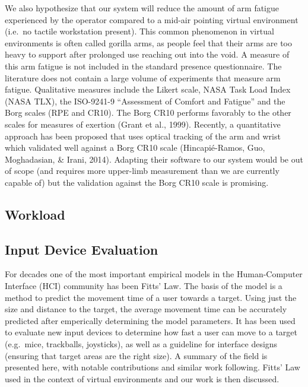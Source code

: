 We also hypothesize that our system will reduce the amount of arm fatigue experienced by the operator compared to a mid-air pointing virtual environment (i.e.\ no tactile workstation present).
This common phenomenon in virtual environments is often called gorilla arms, as people feel that their arms are too heavy to support after prolonged use reaching out into the void.
A measure of this arm fatigue is not included in the standard presence questionnaire.
The literature does not contain a large volume of experiments that measure arm fatigue.
 Qualitative measures include the Likert scale, NASA Task Load Index (NASA TLX), the ISO-9241-9 ``Assessment of Comfort and Fatigue'' and the Borg scales (RPE and CR10).
The Borg CR10 performs favorably to the other scales for measures of exertion (Grant et al., 1999).
Recently, a quantitative approach has been proposed that uses optical tracking of the arm and wrist which validated well against a Borg CR10 scale (Hincapié-Ramos, Guo, Moghadasian, \& Irani, 2014).
Adapting their software to our system would be out of scope (and requires more upper-limb measurement than we are currently capable of) but the validation against the Borg CR10 scale is promising.

\subsection{Workload}


\subsection{Input Device Evaluation}
\label{input-device-evaluation}

For decades one of the most important empirical models in the Human-Computer Interface (HCI) community has been Fitts' Law.
The basis of the model is a method to predict the movement time of a user towards a target.
Using just the size and distance to the target, the average movement time can be accurately predicted after emperically determining the model parameters.
It has been used to evaluate new input devices to determine how fast a user can move to a target (e.g.\ mice, trackballs, joysticks), as well as a guideline for interface designs (ensuring that target areas are the right size).
A summary of the field is presented here, with notable contributions and similar work following.
Fitts' Law used in the context of virtual environments and our work is then discussed.

